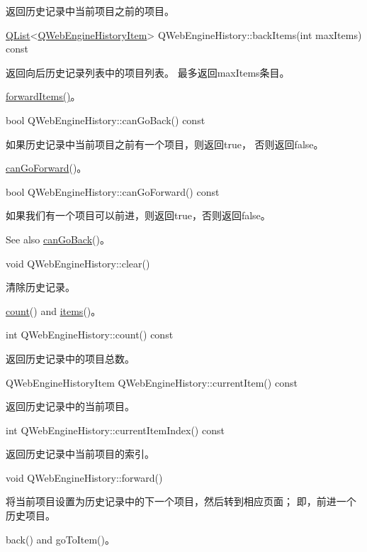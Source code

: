 返回历史记录中当前项目之前的项目。

\href{https://github.com/QtDocumentCN/QtDocumentCN/blob/master/Src/L/QList/QList.md}{QList}<\href{https://github.com/QtDocumentCN/QtDocumentCN/blob/master/Src/W/QWebEngineHistoryItem/QWebEngineHistoryItem.md}{QWebEngineHistoryItem}> QWebEngineHistory::backItems(int maxItems) const

返回向后历史记录列表中的项目列表。 最多返回maxItems条目。

\begin{seeAlso}
\href{https://doc.qt.io/qt-5/qwebenginehistory.html#forwardItems}{forwardItems()}。
\end{seeAlso}

bool QWebEngineHistory::canGoBack() const

如果历史记录中当前项目之前有一个项目，则返回true， 否则返回false。

\begin{seeAlso}
\href{https://doc.qt.io/qt-5/qwebenginehistory.html#canGoForward}{canGoForward}()。
\end{seeAlso}


bool QWebEngineHistory::canGoForward() const

如果我们有一个项目可以前进，则返回true，否则返回false。

See also \href{https://doc.qt.io/qt-5/qwebenginehistory.html#canGoBack}{canGoBack}()。

void QWebEngineHistory::clear()

清除历史记录。

\begin{seeAlso}
\href{https://doc.qt.io/qt-5/qwebenginehistory.html#count}{count}() and \href{https://doc.qt.io/qt-5/qwebenginehistory.html#items}{items}()。
\end{seeAlso}


int QWebEngineHistory::count() const

返回历史记录中的项目总数。

QWebEngineHistoryItem QWebEngineHistory::currentItem() const

返回历史记录中的当前项目。

int QWebEngineHistory::currentItemIndex() const

返回历史记录中当前项目的索引。

void QWebEngineHistory::forward()

将当前项目设置为历史记录中的下一个项目，然后转到相应页面； 即，前进一个历史项目。

\begin{seeAlso}
back() and goToItem()。
\end{seeAlso}


